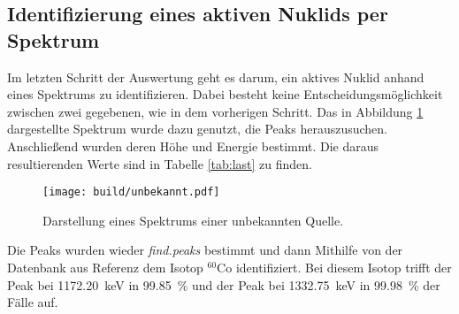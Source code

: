\subsection{Identifizierung eines aktiven Nuklids per Spektrum}
\label{sec:Nuklidbestimmung}
Im letzten Schritt der Auswertung geht es darum, ein aktives Nuklid anhand eines
Spektrums zu identifizieren. Dabei besteht keine Entscheidungsmöglichkeit zwischen
zwei gegebenen, wie in dem vorherigen Schritt.
Das in Abbildung \ref{plt:unbekannt} dargestellte Spektrum wurde dazu genutzt, die Peaks herauszusuchen.
Anschließend wurden deren Höhe und Energie bestimmt. Die daraus
resultierenden Werte sind in Tabelle \ref{tab:last} zu finden.
\begin{figure}[htb]
  \centering
  \texttt{[image: build/unbekannt.pdf]}
  \caption{Darstellung eines Spektrums einer unbekannten Quelle.}
  \label{plt:unbekannt}
\end{figure}

\FloatBarrier
Die Peaks wurden wieder  \textit{find.peaks} bestimmt und dann Mithilfe von der
Datenbank aus Referenz \cite{referenz} dem Isotop $^{60}\text{Co}$ identifiziert.
Bei diesem Isotop trifft der Peak bei \SI{1172.20}{\kilo\electronvolt} in
\SI{99.85}{\percent} und der Peak bei \SI{1332.75}{\kilo\electronvolt} in
\SI{99.98}{\percent} der Fälle auf.

